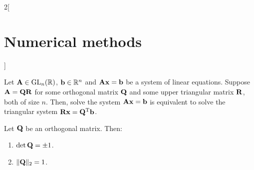 \documentclass[../../../main.tex]{subfiles}
\begin{document}
\begin{multicols}{2}[\section{Numerical methods}]
\begin{definition}[QR descompostion]
\end{definition}
\begin{lemma}
    Let $\vb{A}\in\mathrm{GL}_n(\mathbb{R})$, $\vb{b}\in\mathbb{R}^n$ and $\vb{A}\vb{x}=\vb{b}$ be a system of linear equations. Suppose $\vb{A}=\vb{Q}\vb{R}$ for some orthogonal matrix $\vb{Q}$ and some upper triangular matrix $\vb{R}$, both of size $n$. Then, solve the system $\vb{A}\vb{x}=\vb{b}$ is equivalent to solve the triangular system $\vb{R}\vb{x}=\vb{Q}^{\mathrm{T}}\vb{b}$.
\end{lemma}
\begin{lemma}
    Let $\vb{Q}$ be an orthogonal matrix. Then:
    \begin{enumerate}
        \item $\det\vb{Q}=\pm 1$.
        \item $\|\vb{Q}\|_2=1$.
    \end{enumerate}
\end{lemma}
\end{multicols}
\end{document}
